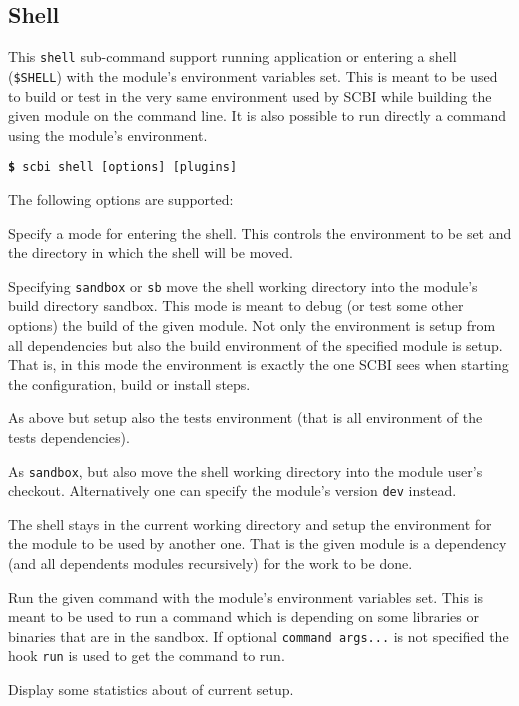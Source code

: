 \documentclass[a4paper,12pt,twoside]{article}
\newcommand{\code}[1]{\texttt{#1}}
\newcommand{\cmd}[1]{\tabto{1cm}\hspace{0.5cm}\texttt{\textbf{\$} #1}}
\newcommand{\ddash}{-{}-}
\begin{document}
\subsection{Shell}
\label{shell}

This \code{shell} sub-command support running application or entering a shell (\code{\$SHELL}) with the module's environment variables set. This is meant to be used to build or test in the very same environment used by SCBI while building the given module on the command line. It is also possible to run directly a command using the module's environment.

\cmd{scbi shell [options] [plugins]}

The following options are supported:

\begin{description}[font=\texttt]

	\item[\ddash{}mode:{[}dev|sandbox|sb|tests|use{]}] Specify a mode for entering the shell. This controls the environment to be set and the directory in which the shell will be moved.

	\begin{description}[font=\texttt]
		\item[sandbox] Specifying \code{sandbox} or \code{sb} move the shell working directory into the module's build directory sandbox. This mode is meant to debug (or test some other options) the build of the given module. Not only the environment is setup from all dependencies but also the build environment of the specified module is setup. That is, in this mode the environment is exactly the one SCBI sees when starting the configuration, build or install steps.

		\item[tests] As above but setup also the tests environment (that is all environment of the tests dependencies).

		\item[dev] As \code{sandbox}, but also move the shell working directory into the module user's checkout. Alternatively one can specify the module's version \code{dev} instead.

		\item[use|no sub-option] The shell stays in the current working directory and setup the environment for the module to be used by another one. That is the given module is a dependency (and all dependents modules recursively) for the work to be done.
	\end{description}

	\item[\ddash{}run{[}="command args..."{]}] \label{cmd!run}Run the given command with the module's environment variables set. This is meant to be used to run a command which is depending on some libraries or binaries that are in the sandbox. If optional \code{command args...} is not specified the hook \code{run} is used to get the command to run.

	\item[\ddash{}stat] Display some statistics about of current setup.
\end{description}
\end{document}
